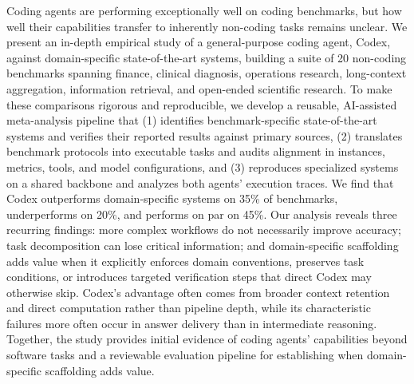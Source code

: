 Coding agents are performing exceptionally well on coding benchmarks, but how well their capabilities transfer to inherently non-coding tasks remains unclear. We present an in-depth empirical study of a general-purpose coding agent, Codex, against domain-specific state-of-the-art systems, building a suite of 20 non-coding benchmarks spanning finance, clinical diagnosis, operations research, long-context aggregation, information retrieval, and open-ended scientific research. To make these comparisons rigorous and reproducible, we develop a reusable, AI-assisted meta-analysis pipeline that (1) identifies benchmark-specific state-of-the-art systems and verifies their reported results against primary sources, (2) translates benchmark protocols into executable tasks and audits alignment in instances, metrics, tools, and model configurations, and (3) reproduces specialized systems on a shared backbone and analyzes both agents’ execution traces. We find that Codex outperforms domain-specific systems on 35\% of benchmarks, underperforms on 20\%, and performs on par on 45\%. Our analysis reveals three recurring findings: more complex workflows do not necessarily improve accuracy; task decomposition can lose critical information; and domain-specific scaffolding adds value when it explicitly enforces domain conventions, preserves task conditions, or introduces targeted verification steps that direct Codex may otherwise skip. Codex’s advantage often comes from broader context retention and direct computation rather than pipeline depth, while its characteristic failures more often occur in answer delivery than in intermediate reasoning. Together, the study provides initial evidence of coding agents’ capabilities beyond software tasks and a reviewable evaluation pipeline for establishing when domain-specific scaffolding adds value.
